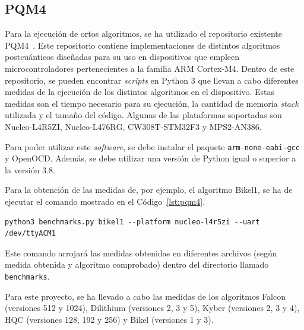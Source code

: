 \subsection{PQM4}\label{subsec:pqm4}

Para la ejecución de ortos algoritmos, se ha utilizado el repositorio existente PQM4~\cite{pqm4}.
Este repositorio contiene implementaciones de distintos algoritmos postcuánticos diseñadas para su uso en dispositivos que empleen microcontroladores pertenecientes a la familia ARM Cortex-M4.
Dentro de este repositorio, se pueden encontrar \textit{scripts} en Python 3 que llevan a cabo diferentes medidas de la ejecución de los distintos algoritmos en el dispositivo.
Estas medidas son el tiempo necesario para su ejecución, la cantidad de memoria \textit{stack} utilizada y el tamaño del código.
Algunas de las plataformas soportadas son Nucleo-L4R5ZI, Nucleo-L476RG, CW308T-STM32F3 y MPS2-AN386.

Para poder utilizar este \textit{software}, se debe instalar el paquete \texttt{arm-none-eabi-gcc} y OpenOCD.
Además, se debe utilizar una versión de Python igual o superior a la versión 3.8.

Para la obtención de las medidas de, por ejemplo, el algoritmo Bikel1, se ha de ejecutar el comando mostrado en el Código~\ref{lst:pqm4}.

\begin{lstlisting}[label={lst:pqm4},style=Cnice,firstnumber=1,caption={Comando para la obtención de medidas utilizando PQM4.}]
python3 benchmarks.py bikel1 --platform nucleo-l4r5zi --uart /dev/ttyACM1
\end{lstlisting}

Este comando arrojará las medidas obtenidas en diferentes archivos (según medida obtenida y algoritmo comprobado) dentro del directorio llamado \texttt{benchmarks}.

Para este proyecto, se ha llevado a cabo las medidas de los algoritmos Falcon (versiones 512 y 1024), Dilithium (versiones 2, 3 y 5), Kyber (versiones 2, 3 y 4), HQC (versiones 128, 192 y 256) y Bikel (versiones 1 y 3).


